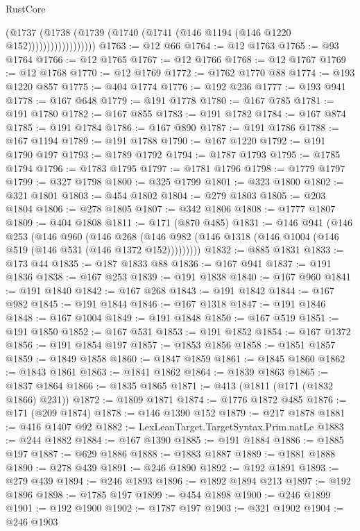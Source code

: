 \begin{lexlean}{RustCore}
\begin{coremodule}
                          (@1737
                            (@1738
                              (@1739 (@1740 (@1741 (@146 @1194 (@146 @1220 @152))))))))))))))))))
@1763 := @12 @66
@1764 := @12 @1763
@1765 := @93 @1764
@1766 := @12 @1765
@1767 := @12 @1766
@1768 := @12 @1767
@1769 := @12 @1768
@1770 := @12 @1769
@1772 := @1762 @1770 @88
@1774 := @193 @1220 @857
@1775 := @404 @1774
@1776 := @192 @236
@1777 := @193 @941
@1778 := @167 @648
@1779 := @191 @1778
@1780 := @167 @785
@1781 := @191 @1780
@1782 := @167 @855
@1783 := @191 @1782
@1784 := @167 @874
@1785 := @191 @1784
@1786 := @167 @890
@1787 := @191 @1786
@1788 := @167 @1194
@1789 := @191 @1788
@1790 := @167 @1220
@1792 := @191 @1790 @197
@1793 := @1789 @1792
@1794 := @1787 @1793
@1795 := @1785 @1794
@1796 := @1783 @1795
@1797 := @1781 @1796
@1798 := @1779 @1797
@1799 := @327 @1798
@1800 := @325 @1799
@1801 := @323 @1800
@1802 := @321 @1801
@1803 := @454 @1802
@1804 := @279 @1803
@1805 := @203 @1804
@1806 := @278 @1805
@1807 := @342 @1806
@1808 := @1777 @1807
@1809 := @404 @1808
@1811 := @171 (@870 @485)
@1831 := @146
    @941
    (@146
      @253
      (@146
        @960
        (@146
          @268
          (@146 @982 (@146 @1318 (@146 @1004 (@146 @519 (@146 @531 (@146 @1372 @152)))))))))
@1832 := @885 @1831
@1833 := @173 @44
@1835 := @187 @1833 @88
@1836 := @167 @941
@1837 := @191 @1836
@1838 := @167 @253
@1839 := @191 @1838
@1840 := @167 @960
@1841 := @191 @1840
@1842 := @167 @268
@1843 := @191 @1842
@1844 := @167 @982
@1845 := @191 @1844
@1846 := @167 @1318
@1847 := @191 @1846
@1848 := @167 @1004
@1849 := @191 @1848
@1850 := @167 @519
@1851 := @191 @1850
@1852 := @167 @531
@1853 := @191 @1852
@1854 := @167 @1372
@1856 := @191 @1854 @197
@1857 := @1853 @1856
@1858 := @1851 @1857
@1859 := @1849 @1858
@1860 := @1847 @1859
@1861 := @1845 @1860
@1862 := @1843 @1861
@1863 := @1841 @1862
@1864 := @1839 @1863
@1865 := @1837 @1864
@1866 := @1835 @1865
@1871 := @413 (@1811 (@171 (@1832 @1866) @231))
@1872 := @1809 @1871
@1874 := @1776 @1872 @485
@1876 := @171 (@209 @1874)
@1878 := @146 @1390 @152
@1879 := @217 @1878
@1881 := @416 @1407 @92
@1882 := LexLeanTarget.TargetSyntax.Prim.natLe
@1883 := @244 @1882
@1884 := @167 @1390
@1885 := @191 @1884
@1886 := @1885 @197
@1887 := @629 @1886
@1888 := @1883 @1887
@1889 := @1881 @1888
@1890 := @278 @439
@1891 := @246 @1890
@1892 := @192 @1891
@1893 := @279 @439
@1894 := @246 @1893
@1896 := @1892 @1894 @213
@1897 := @192 @1896
@1898 := @1785 @197
@1899 := @454 @1898
@1900 := @246 @1899
@1901 := @192 @1900
@1902 := @1787 @197
@1903 := @321 @1902
@1904 := @246 @1903

\end{coremodule}
\end{lexlean}
